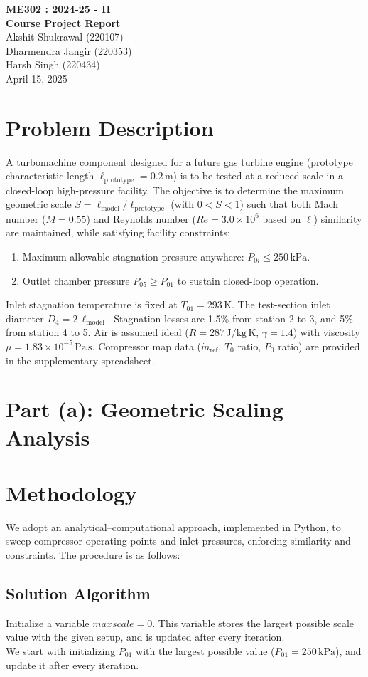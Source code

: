 \documentclass[12pt,a4paper]{article}
\renewcommand{\maketitle}{%
  \begin{center}
    \vspace*{4cm}
    \LARGE\textbf{ME302 : 2024-25 - II} \\[1cm]
    \LARGE\textbf{Course Project Report} \\[4cm]
    \large
    Akshit Shukrawal (220107) \\
    Dharmendra Jangir (220353) \\
    Harsh Singh (220434) \\[2cm]
    \large April 15, 2025
  \end{center}
  \thispagestyle{empty}
  \newpage
}
\begin{document}
\maketitle

\section*{Problem Description}
A turbomachine component designed for a future gas turbine engine (prototype characteristic length $\ell_{\mathrm{prototype}}=0.2\,\mathrm{m}$) is to be tested at a reduced scale in a closed-loop high-pressure facility. The objective is to determine the maximum geometric scale $S=\ell_{\mathrm{model}}/\ell_{\mathrm{prototype}}$ (with $0<S<1$) such that both Mach number ($M=0.55$) and Reynolds number ($Re=3.0\times10^6$ based on $\ell$) similarity are maintained, while satisfying facility constraints:
\begin{enumerate}
  \item Maximum allowable stagnation pressure anywhere: $P_{0i}\leq250\,\mathrm{kPa}$.
  \item Outlet chamber pressure $P_{05}\geq P_{01}$ to sustain closed-loop operation.
\end{enumerate}
Inlet stagnation temperature is fixed at $T_{01}=293\,\mathrm{K}$.  The test-section inlet diameter $D_4=2\,\ell_{\mathrm{model}}$.  Stagnation losses are 1.5\% from station 2 to 3, and 5\% from station 4 to 5.  Air is assumed ideal ($R=287\,\mathrm{J/kg\,K}$, $\gamma=1.4$) with viscosity $\mu=1.83\times10^{-5}\,\mathrm{Pa\,s}$.  Compressor map data ($\dot m_{\mathrm{ref}}$, $T_0$ ratio, $P_0$ ratio) are provided in the supplementary spreadsheet.\\
\section*{Part (a): Geometric Scaling Analysis}

\section*{Methodology}
We adopt an analytical–computational approach, implemented in Python, to sweep compressor operating points and inlet pressures, enforcing similarity and constraints.  The procedure is as follows:

\subsection*{Solution Algorithm}
Initialize a variable $\mathit{maxscale} = 0$. This variable stores the largest possible scale value with the given setup, and is updated after every iteration.\\
We start with initializing $P_{01}$ with the largest possible value ($P_{01} = 250\,\mathrm{kPa}$), and update it after every iteration.
\end{document}
